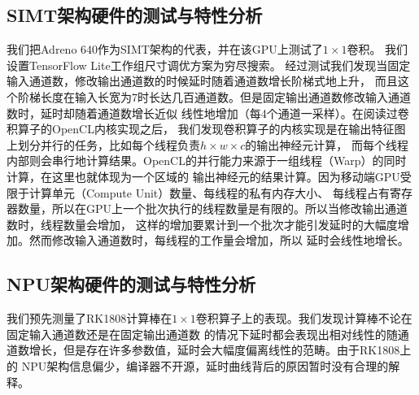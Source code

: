 \subsection{SIMT架构硬件的测试与特性分析}
我们把Adreno 640作为SIMT架构的代表，并在该GPU上测试了$1\times 1$卷积。
我们设置TensorFlow Lite工作组尺寸调优方案为穷尽搜索。
经过测试我们发现当固定输入通道数，修改输出通道数的时候延时随着通道数增长阶梯式地上升，
而且这个阶梯长度在输入长宽为7时长达几百通道数。但是固定输出通道数修改输入通道数时，延时却随着通道数增长近似
线性地增加（每4个通道一采样）。在阅读过卷积算子的OpenCL内核实现之后，
我们发现卷积算子的内核实现是在输出特征图上划分并行的任务，比如每个线程负责$h\times w\times c$的输出神经元计算，
而每个线程内部则会串行地计算结果。OpenCL的并行能力来源于一组线程（Warp）的同时计算，在这里也就体现为一个区域的
输出神经元的结果计算。因为移动端GPU受限于计算单元（Compute Unit）数量、每线程的私有内存大小、
每线程占有寄存器数量，所以在GPU上一个批次执行的线程数量是有限的。所以当修改输出通道数时，线程数量会增加，
这样的增加要累计到一个批次才能引发延时的大幅度增加。然而修改输入通道数时，每线程的工作量会增加，所以
延时会线性地增长。

\subsection{NPU架构硬件的测试与特性分析}
我们预先测量了RK1808计算棒在$1\times 1$卷积算子上的表现。我们发现计算棒不论在固定输入通道数还是在固定输出通道数
的情况下延时都会表现出相对线性的随通道数增长，但是存在许多参数值，延时会大幅度偏离线性的范畴。由于RK1808上的
NPU架构信息偏少，编译器不开源，延时曲线背后的原因暂时没有合理的解释。